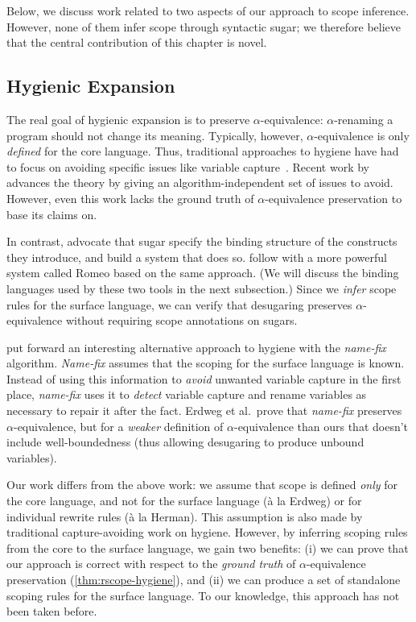 Below, we discuss work related to two aspects of our approach to
scope inference. However, none of them infer scope through syntactic
sugar; we therefore believe that the central contribution of this
chapter is novel.

\subsection{Hygienic Expansion}

The real goal of hygienic expansion is to preserve
$\alpha$-equivalence: $\alpha$-renaming a program should not change
its meaning. Typically, however, $\alpha$-equivalence is only
\emph{defined} for the core language. Thus, traditional approaches to
hygiene have had to focus on avoiding specific issues like
variable capture~\cite{hygienic-macros}.
Recent work by \cite{adams-hygiene} advances the theory by
giving an algorithm-independent set of issues to
avoid. However, even this work lacks the ground truth of
$\alpha$-equivalence preservation to base its claims on.

In contrast, \cite{herman-hygiene}
advocate that sugar specify the binding structure of the constructs
they introduce, and build a system that does so.
\cite{stansifer-romeo} follow with a more powerful system
called Romeo based on the same approach.
(We will discuss the binding languages used by these two tools in the
next subsection.)
Since we \emph{infer} scope rules for the surface language, we can
verify that desugaring preserves $\alpha$-equivalence without
requiring scope annotations on sugars.

\cite{erdweg-hygiene} put forward an interesting alternative approach to hygiene
with the \emph{name-fix} algorithm.
\emph{Name-fix} assumes that the scoping for the surface language is
known. Instead of using this information to \emph{avoid} unwanted
variable capture in the first place, \emph{name-fix} uses it
to \emph{detect} variable capture and rename variables as necessary to
repair it after the fact. Erdweg et al.\ prove that \emph{name-fix}
preserves $\alpha$-equivalence, but for a \emph{weaker} definition
of $\alpha$-equivalence than ours that doesn't include
well-boundedness (thus allowing desugaring to produce unbound variables).

Our work differs from the above work: we assume that scope is defined
\emph{only} for the core language, and not for the
surface language (\`a la Erdweg) or for individual rewrite rules (\`a la Herman).
This assumption is also made by traditional capture-avoiding work on
hygiene. However, by inferring scoping rules from the core to
the surface language, we gain two benefits: (i) we can prove that our
approach is correct with respect to the \emph{ground truth} of
$\alpha$-equivalence preservation (\cref{thm:rscope-hygiene}), and (ii)
we can produce a set of standalone scoping rules for the surface
language. To our knowledge, this approach has not been taken before.


